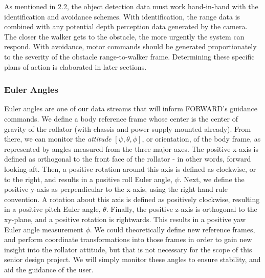 \noindent As mentioned in 2.2, the object detection data must work hand-in-hand with the identification and avoidance schemes. With identification, the range data is combined with any potential depth perception data generated by the camera. The closer the walker gets to the obstacle, the more urgently the system can respond. With avoidance, motor commands should be generated proportionately to the severity of the obstacle range-to-walker frame. Determining these specific plans of action is elaborated in later sections.\\


\subsubsection{Euler Angles}
\noindent Euler angles are one of our data streams that will inform FORWARD's guidance commands. We define a body reference frame whose center is the center of gravity of the rollator (with chassis and power supply mounted already). From there, we can monitor the \textit{attitude} $[\psi, \theta, \phi]$, or orientation, of the body frame, as represented by angles measured from the three major axes. The positive x-axis is defined as orthogonal to the front face of the rollator - in other words, forward looking-aft. Then, a positive rotation around this axis is defined as clockwise, or to the right, and results in a positive roll Euler angle, $\psi$. Next, we define the positive y-axis as perpendicular to the x-axis, using the right hand rule convention. A rotation about this axis is defined as positively clockwise, resulting in a positive pitch Euler angle, $\theta$. Finally, the positive z-axis is orthogonal to the xy-plane, and a positive rotation is rightwards. This results in a positive yaw Euler angle measurement $\phi$. We could theoretically define new reference frames, and perform coordinate transformations into those frames in order to gain new insight into the rollator attitude, but that is not necessary for the scope of this senior design project. We will simply monitor these angles to ensure stability, and aid the guidance of the user.\\

